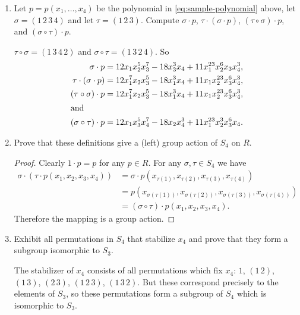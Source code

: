 \begin{enumerate}
\item Let $p = p(x_1,\dots,x_4)$ be the polynomial in
  \eqref{eq:sample-polynomial} above, let $\sigma = (1\,2\,3\,4)$ and
  let $\tau = (1\,2\,3)$. Compute $\sigma\cdot p$,
  $\tau\cdot(\sigma\cdot p)$, $(\tau\circ\sigma)\cdot p$, and
  $(\sigma\circ\tau)\cdot p$.
  \begin{solution}
    $\tau\circ\sigma = (1\,3\,4\,2)$ and
    $\sigma\circ\tau = (1\,3\,2\,4)$. So
    \begin{align*}
      \sigma\cdot p
      &= 12x_1x_2^5x_3^7 - 18x_3^3x_4 + 11x_1^{23}x_2^6x_3x_4^3, \\
      \tau\cdot(\sigma\cdot p)
      &= 12x_1^7x_2x_3^5 - 18x_1^3x_4 + 11x_1x_2^{23}x_3^6x_4^3, \\
      (\tau\circ\sigma)\cdot p
      &= 12x_1^7x_2x_3^5 - 18x_1^3x_4 + 11x_1x_2^{23}x_3^6x_4^3, \\
      \intertext{and}
      (\sigma\circ\tau)\cdot p
      &= 12x_1x_3^5x_4^7 - 18x_2x_4^3 + 11x_1^{23}x_2^3x_3^6x_4.\qedhere
    \end{align*}
  \end{solution}
\item Prove that these definitions give a (left) group action of $S_4$
  on $R$.
  \begin{proof}
    Clearly $1\cdot p = p$ for any $p\in R$. For any
    $\sigma,\tau\in S_4$ we have
    \begin{align*}
      \sigma\cdot(\tau\cdot p(x_1,x_2,x_3,x_4))
      &= \sigma\cdot p(x_{\tau(1)},x_{\tau(2)},
        x_{\tau(3)},x_{\tau(4)}) \\
      &= p(x_{\sigma(\tau(1))},x_{\sigma(\tau(2))},
      x_{\sigma(\tau(3))},x_{\sigma(\tau(4))}) \\
      &= (\sigma\circ\tau)\cdot p(x_1,x_2,x_3,x_4).
    \end{align*}
    Therefore the mapping is a group action.
  \end{proof}
\item Exhibit all permutations in $S_4$ that stabilize $x_4$ and prove
  that they form a subgroup isomorphic to $S_3$.
  \begin{solution}
    The stabilizer of $x_4$ consists of all permutations which fix
    $x_4$: $1$, $(1\,2)$, $(1\,3)$, $(2\,3)$, $(1\,2\,3)$,
    $(1\,3\,2)$. But these correspond precisely to the elements of
    $S_3$, so these permutations form a subgroup of $S_4$ which is
    isomorphic to $S_3$.
  \end{solution}

\end{enumerate}
